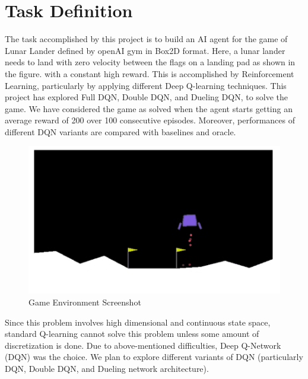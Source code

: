 \section{Task Definition}
\label{intro}

The task accomplished by this project is to build an AI agent for the game of Lunar Lander defined by openAI gym in Box2D format. Here, a lunar lander needs to land with zero velocity between the flags on a landing pad as shown in the figure. with a constant high reward. This is accomplished by Reinforcement Learning, particularly by applying different Deep Q-learning techniques. This project has explored Full DQN, Double DQN, and Dueling DQN, to solve the game. We have considered the game as solved when the agent starts getting an average reward of 200 over 100 consecutive episodes. Moreover, performances of different DQN variants are compared with baselines and oracle. \\

\begin{figure}[!ht]
\centering
\includegraphics[scale=0.75,width=0.75\columnwidth]{figures/game.png}%
\caption{ Game Environment Screenshot}%
\label{fig:Visualization}%
\end{figure}

Since this problem involves high dimensional and continuous state
space, standard Q-learning cannot solve this problem unless some amount of discretization is done. Due to above-mentioned difficulties, Deep Q-Network (DQN) was the choice. We plan to explore different variants of DQN (particularly DQN, Double DQN, and
Dueling network architecture).



